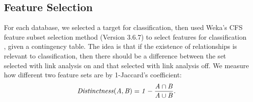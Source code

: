 \documentclass{sig-alternate-2013}
\begin{document}
\subsection{Feature Selection} For each database, we selected a target for classification, then used Weka's CFS feature subset selection method (Version 3.6.7) to select features for classification \cite{Hall2009}, given a contingency table. The idea is that if the existence of relationships is relevant to classification, then there should be a difference between the set selected with link analysis on and that selected with link analysis off. 
We measure how different two feature sets are by 1-Jaccard's coefficient:
$$\it{Distinctness}(A,B) = 1- \frac{A \cap B}{A \cup B}.$$


\begin{table}[htbp] \centering
\caption{Selected Features for Target variables for  Link Analysis Off vs. Link Analysis On. Rvars denotes the number of relationship features selected. 
\label{table:feature-select}}
\end{table}

\end{document}
